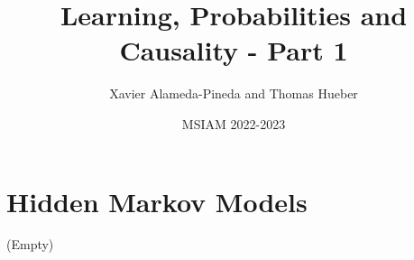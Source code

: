 \documentclass[a4paper]{report}
\title{Learning, Probabilities and Causality - Part 1}
\author{Xavier Alameda-Pineda and Thomas Hueber}
\date{MSIAM 2022-2023}
\numberwithin{equation}{chapter}
\numberwithin{exercise}{chapter}
\numberwithin{remark}{chapter}
\begin{document}
\maketitle

\tableofcontents





\chapter{Hidden Markov Models}
\label{ch:hmm}
(Empty)







\end{document}
